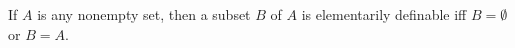 If $A$ is any nonempty set, then a subset $B$ of $A$ is elementarily definable iff $B = \emptyset$ or $B = A$.
